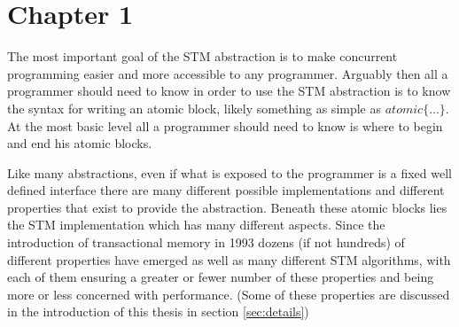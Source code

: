 \section{Chapter 1}
The most important goal of the STM abstraction is to make concurrent programming
easier and more accessible to any programmer.
Arguably then all a programmer should need to know in order to use the STM abstraction is to know
the syntax for writing an atomic block, likely something as simple as
$atomic \{ \dots \} $.
At the most basic level all a programmer should need to know is where
to begin and end his atomic blocks.







Like many abstractions, even if what is exposed to the programmer is a fixed well
defined interface there are many different possible implementations and different
properties that exist to provide the abstraction.
Beneath these atomic blocks lies the STM implementation which has many different aspects.
Since the introduction of transactional memory in 1993 \cite{HM93} dozens (if not hundreds) of different properties have emerged
as well as many different STM algorithms,
with each of them ensuring a greater or fewer number of these properties and being more or less
concerned with performance.
(Some of these properties are discussed in the introduction of this thesis in section \ref{sec:details})

